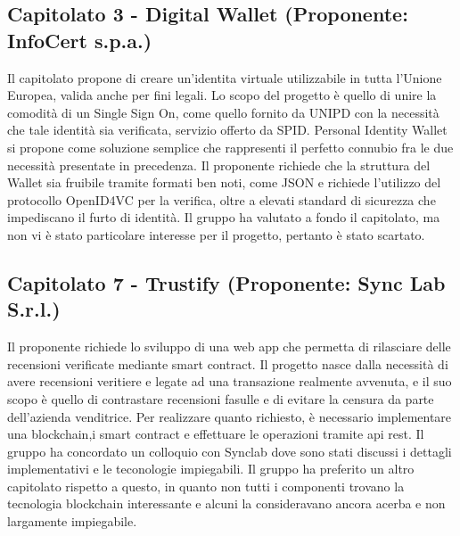 \documentclass[12pt]{article}
\begin{document}
\subsection{Capitolato 3 - Digital Wallet (Proponente: InfoCert s.p.a.)}
    Il capitolato propone di creare un'identita virtuale utilizzabile in tutta l'Unione Europea, valida anche per fini legali. Lo scopo del progetto è quello di unire la comodità di un Single Sign On, come quello fornito da UNIPD con la necessità che tale identità sia verificata, servizio offerto da SPID.
    Personal Identity Wallet si propone come soluzione semplice che rappresenti il perfetto connubio fra le due necessità presentate in precedenza.
    Il proponente richiede che la struttura del Wallet sia fruibile tramite formati ben noti, come JSON e richiede l'utilizzo del protocollo OpenID4VC per la verifica, oltre a elevati standard di sicurezza che impediscano il furto di identità.
    Il gruppo ha valutato a fondo il capitolato, ma non vi è stato particolare interesse per il progetto, pertanto è stato scartato.

\subsection{Capitolato 7 - Trustify (Proponente: Sync Lab S.r.l.)}
    Il proponente richiede lo sviluppo di una web app che permetta di rilasciare delle recensioni verificate mediante smart contract. Il progetto nasce dalla necessità di avere recensioni veritiere e legate ad una transazione realmente avvenuta, e il suo scopo è quello di contrastare recensioni fasulle e di evitare la censura da parte dell'azienda venditrice.
    Per realizzare quanto richiesto, è necessario implementare una blockchain,i smart contract e effettuare le operazioni tramite api rest.
    Il gruppo ha concordato un colloquio con Synclab dove sono stati discussi i dettagli implementativi e le teconologie impiegabili.
    Il gruppo ha preferito un altro capitolato rispetto a questo, in quanto non tutti i componenti trovano la tecnologia blockchain interessante e alcuni la consideravano ancora acerba e non largamente impiegabile.
\end{document}
